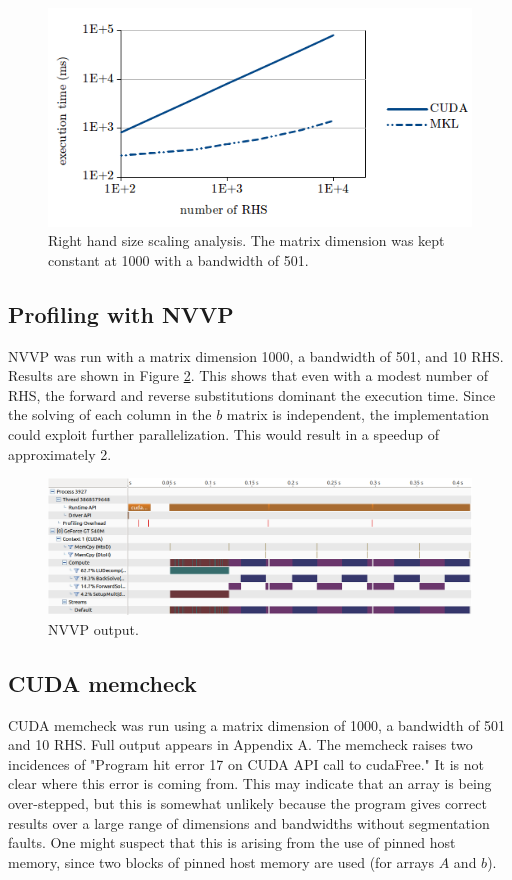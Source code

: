 \documentclass[12pt]{article}
\begin{document}
\begin{figure}[H]
\caption{Right hand size scaling analysis. The matrix dimension was kept constant at 1000 with a bandwidth of 501.}
\label{rhs}
\centerline{\includegraphics[width=12cm]{rhs.png}}
\end{figure}


\subsection{Profiling with NVVP}

NVVP was run with a matrix dimension 1000, a bandwidth of 501, and 10 RHS.
 Results are shown in Figure \ref{nvvp}. This shows that even with a
modest number of RHS, the forward and reverse substitutions
dominant the execution time. Since the solving of each column in the $b$ matrix is
independent, the implementation could exploit further
parallelization. This would result in a speedup of approximately 2.

\begin{figure}[H]
\caption{NVVP output.}
\label{nvvp}
\centerline{\includegraphics[width=12cm]{nvvp.png}}
\end{figure}

\subsection{CUDA memcheck}

CUDA memcheck was run using a matrix dimension of 1000, a
bandwidth of 501 and 10 RHS. Full output appears in Appendix A. The
memcheck raises two incidences of "Program hit error 17 on CUDA API call to
cudaFree." It is not clear where this error is coming from. This may
indicate that an array is being over-stepped, but this is somewhat unlikely
because the program gives correct results over a large range of dimensions and
bandwidths without segmentation faults. One might suspect that this is arising from the use of pinned host
memory, since two blocks of pinned host memory are used (for arrays $A$ and
$b$).
\end{document}
